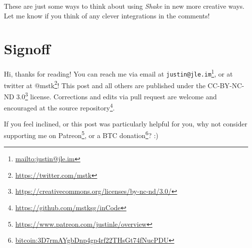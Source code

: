 \documentclass[]{article}
\renewcommand{\href}[2]{#2\footnote{\url{#1}}}
\begin{document}
These are just some ways to think about using \emph{Shake} in new more creative
ways. Let me know if you think of any clever integrations in the comments!

\hypertarget{signoff}{%
\section{Signoff}\label{signoff}}

Hi, thanks for reading! You can reach me via email at
\href{mailto:justin@jle.im}{\nolinkurl{justin@jle.im}}, or at twitter at
\href{https://twitter.com/mstk}{@mstk}! This post and all others are published
under the \href{https://creativecommons.org/licenses/by-nc-nd/3.0/}{CC-BY-NC-ND
3.0} license. Corrections and edits via pull request are welcome and encouraged
at \href{https://github.com/mstksg/inCode}{the source repository}.

If you feel inclined, or this post was particularly helpful for you, why not
consider \href{https://www.patreon.com/justinle/overview}{supporting me on
Patreon}, or a \href{bitcoin:3D7rmAYgbDnp4gp4rf22THsGt74fNucPDU}{BTC donation}?
:)
\end{document}
